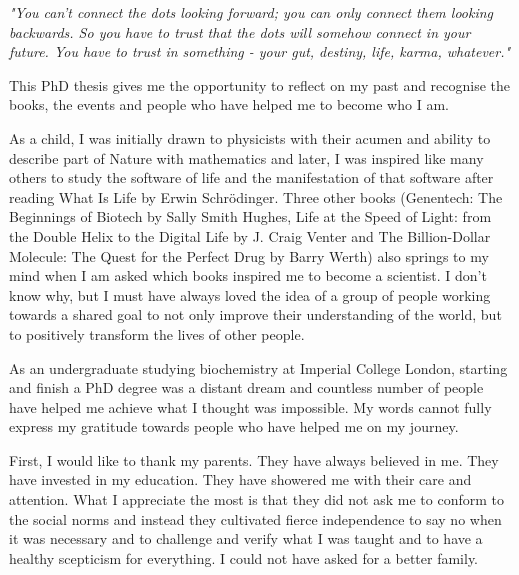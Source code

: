 
\begin{acknowledgements}      

\textit{"You can't connect the dots looking forward; you can only connect them looking backwards. So you have to trust that the dots will somehow connect in your future. You have to trust in something - your gut, destiny, life, karma, whatever."} 
\begin{flushright}  \end{flushright}

This PhD thesis gives me the opportunity to reflect on my past and recognise the books, the events and people who have helped me to become who I am. 

As a child, I was initially drawn to physicists with their acumen and ability to describe part of Nature with mathematics and later, I was inspired like many others to study the software of life and the manifestation of that software after reading What Is Life by Erwin Schrödinger. Three other books (Genentech: The Beginnings of Biotech by Sally Smith Hughes, Life at the Speed of Light: from the Double Helix to the Digital Life by J. Craig Venter and The Billion-Dollar Molecule: The Quest for the Perfect Drug by Barry Werth) also springs to my mind when I am asked which books inspired me to become a scientist. I don’t know why, but I must have always loved the idea of a group of people working towards a shared goal to not only improve their understanding of the world, but to positively transform the lives of other people. 

As an undergraduate studying biochemistry at Imperial College London, starting and finish a PhD degree was a distant dream and countless number of people have helped me achieve what I thought was impossible. My words cannot fully express my gratitude towards people who have helped me on my journey.

First, I would like to thank my parents. They have always believed in me. They have invested in my education. They have showered me with their care and attention. What I appreciate the most is that they did not ask me to conform to the social norms and instead they cultivated fierce independence to say no when it was necessary and to challenge and verify what I was taught and to have a healthy scepticism for everything. I could not have asked for a better family. 


\end{acknowledgements}
